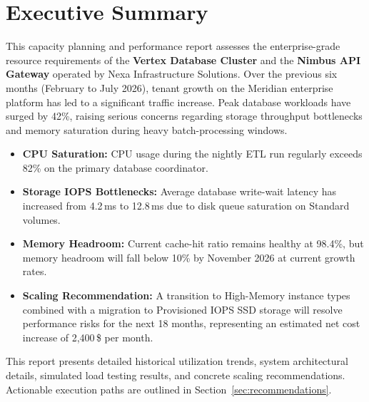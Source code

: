 \section{Executive Summary}
This capacity planning and performance report assesses the enterprise-grade resource requirements of the \textbf{Vertex Database Cluster} and the \textbf{Nimbus API Gateway} operated by Nexa Infrastructure Solutions. Over the previous six months (February to July 2026), tenant growth on the Meridian enterprise platform has led to a significant traffic increase. Peak database workloads have surged by 42\%, raising serious concerns regarding storage throughput bottlenecks and memory saturation during heavy batch-processing windows.

\begin{tcolorbox}[colback=primary!5!white, colframe=primary, arc=3mm, boxrule=1pt, title={Key Findings}]
  \begin{itemize}[leftmargin=*, noitemsep]
    \item \textbf{CPU Saturation:} CPU usage during the nightly ETL run regularly exceeds 82\% on the primary database coordinator.
    \item \textbf{Storage IOPS Bottlenecks:} Average database write-wait latency has increased from 4.2\,ms to 12.8\,ms due to disk queue saturation on Standard volumes.
    \item \textbf{Memory Headroom:} Current cache-hit ratio remains healthy at 98.4\%, but memory headroom will fall below 10\% by November 2026 at current growth rates.
    \item \textbf{Scaling Recommendation:} A transition to High-Memory instance types combined with a migration to Provisioned IOPS SSD storage will resolve performance risks for the next 18 months, representing an estimated net cost increase of 2,400\,\$ per month.
  \end{itemize}
\end{tcolorbox}

This report presents detailed historical utilization trends, system architectural details, simulated load testing results, and concrete scaling recommendations. Actionable execution paths are outlined in Section~\ref{sec:recommendations}.
